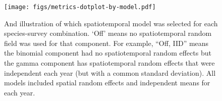 \documentclass[12pt]{article}
\begin{document}
\clearpage

\begin{figure}[htb]
    \centering
    \texttt{[image: figs/metrics-dotplot-by-model.pdf]}
    \caption{And illustration of which spatiotemporal model was selected for each species-survey combination. `Off' means no spatiotemporal random field was used for that component. For example, ``Off, IID'' means the binomial component had no spatiotemporal random effects but the gamma component has spatiotemporal random effects that were independent each year (but with a common standard deviation). All models included spatial random effects and independent means for each year.}
    \label{fig:metrics-by-model}
\end{figure}

\clearpage
\end{document}

